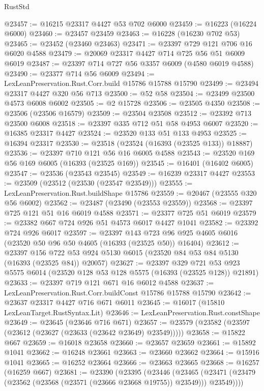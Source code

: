 \begin{lexlean}{RustStd}
\begin{coremodule}
@23457 := @16215 @23317 @4427 @53 @702 @6000
@23459 := @16223 (@16224 @6000)
@23460 := @23457 @23459
@23463 := @16228 (@16230 @702 @53)
@23465 := @23452 (@23460 @23463)
@23471 := @23397 @729 @121 @706 @16 @6020 @4588
@23479 := @20069 @23317 @4427 @714 @725 @56 @51 @6009 @6019
@23487 := @23397 @714 @727 @56 @3357 @6009 (@4580 @6019 @4588)
@23490 := @23377 @714 @56 @6009
@23494 := LexLeanPreservation.Rust.Corr.build @15786 @15788 @15790
@23499 := @23494 @23317 @4427 @320 @56 @713
@23500 := @52 @58
@23504 := @23499 @23500 @4573 @6008 @6002
@23505 := @2 @15728
@23506 := @23505 @4350
@23508 := @23506 (@23506 @16579)
@23509 := @23504 @23508
@23512 := @23392 @713 @23500 @6008
@23518 := @23397 @335 @712 @51 @58 @4953 @6007
@23520 := @16385 @23317 @4427
@23524 := @23520 @133 @51 @133 @4953
@23525 := @16394 @23317
@23530 := @23518 (@23524 (@16393 (@23525 @133)) @18887)
@23536 := @23397 @710 @121 @56 @16 @6005 @4588
@23543 := @23520 @169 @56 @169 @6005 (@16393 (@23525 @169))
@23545 := @16401 (@16402 @6005)
@23547 := @23536 (@23543 @23545)
@23549 := @16239 @23317 @4427
@23553 := @23509 (@23512 (@23530 (@23547 @23549)))
@23555 := LexLeanPreservation.Rust.buildShape @15786
@23559 := @20467 (@23555 @320 @56 @6002)
@23562 := @23487 (@23490 (@23553 @23559))
@23568 := @23397 @725 @121 @51 @16 @6019 @4588
@23571 := @23377 @725 @51 @6019
@23579 := @23382 @667 @724 @926 @51 @4573 @6017 @4427 @1041
@23582 := @23392 @724 @926 @6017
@23597 := @23397
    @143
    @723
    @96
    @925
    @4605
    @6016
    (@23520 @50 @96 @50 @4605 (@16393 (@23525 @50)) @16404)
@23612 := @23397
    @156
    @722
    @53
    @924
    @5130
    @6015
    (@23520 @84 @53 @84 @5130 (@16393 (@23525 @84)) @20057)
@23627 := @23397
    @329
    @721
    @53
    @923
    @5575
    @6014
    (@23520 @128 @53 @128 @5575 (@16393 (@23525 @128)) @21891)
@23633 := @23397 @719 @121 @671 @16 @6012 @4588
@23637 := LexLeanPreservation.Rust.Corr.buildConst @15786 @15788 @15790
@23642 := @23637 @23317 @4427 @716 @671 @6011
@23645 := @16017 (@15810 LexLeanTarget.RustSyntax.Lit)
@23646 := LexLeanPreservation.Rust.constShape
@23649 := @23645 (@23646 @716 @671)
@23657 := @23579 (@23582 (@23597 (@23612 (@23627 (@23633 (@23642 @23649) @23549)))))
@23658 := @15822 @667
@23659 := @16018 @23658
@23660 := @23657 @23659
@23661 := @15892 @1041
@23662 := @16248 @23661
@23663 := @23660 @23662
@23664 := @15916 @1041
@23665 := @16252 @23664
@23666 := @23663 @23665
@23668 := @16257 (@16259 @667)
@23681 := @23390
    (@23395
      (@23446
        (@23465 (@23471 (@23479 (@23562 (@23568 (@23571 (@23666 @23668 @19755)) @23549))) @23549))))

\end{coremodule}
\end{lexlean}
